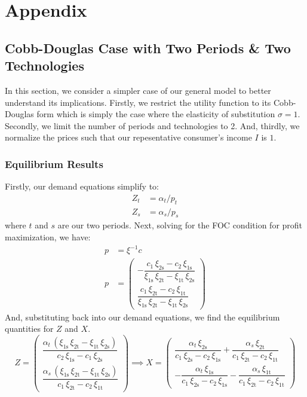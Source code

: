 \documentclass[11pt,a4paper]{extarticle}
\begin{document}
\pagebreak

\section{Appendix}


\subsection{Cobb-Douglas Case with Two Periods \& Two Technologies}

In this section, we consider a simpler case of our general model to better understand its implications. Firstly, we restrict the utility function to its Cobb-Douglas form which is simply the case where the elasticity of substitution $\sigma = 1$. Secondly, we limit the number of periods and technologies to 2. And, thirdly, we normalize the prices such that our repesentative consumer's income $I$ is $1$.

\subsubsection{Equilibrium Results}

Firstly, our demand equations simplify to:
\begin{align}
Z_t &= \alpha_t / p_t \\
Z_s &= \alpha_s / p_s
\end{align}
where $t$ and $s$ are our two periods. Next, solving for the FOC condition for profit maximization, we have:
\begin{align*}
p &=  \xi^{-1} c \\
p &= \begin{pmatrix}
-\dfrac{c_{1}\,\xi _{\mathrm{2s}}-c_{2}\,\xi _{\mathrm{1s}}}{\xi _{\mathrm{1s}}\,\xi _{\mathrm{2t}}-\xi _{\mathrm{1t}}\,\xi _{\mathrm{2s}}}  \\[2ex]
\dfrac{c_{1}\,\xi _{\mathrm{2t}}-c_{2}\,\xi _{\mathrm{1t}}}{\xi _{\mathrm{1s}}\,\xi _{\mathrm{2t}}-\xi _{\mathrm{1t}}\,\xi _{\mathrm{2s}}} 
\end{pmatrix} 
\end{align*}
And, substituting back into our demand equations, we find the equilibrium quantities for $Z$ and $X$. 
$$
Z = \begin{pmatrix}
\dfrac{\alpha _{t}\,\left(\xi _{\mathrm{1s}}\,\xi _{\mathrm{2t}}-\xi _{\mathrm{1t}}\,\xi _{\mathrm{2s}}\right)}{c_{2}\,\xi _{\mathrm{1s}} - c_{1}\,\xi _{\mathrm{2s}}} \\[2ex]
\dfrac{\alpha _{s}\,\left(\xi _{\mathrm{1s}}\,\xi _{\mathrm{2t}}-\xi _{\mathrm{1t}}\,\xi _{\mathrm{2s}}\right)}{c_{1}\,\xi _{\mathrm{2t}}-c_{2}\,\xi _{\mathrm{1t}}} 
\end{pmatrix}
\implies 
X = \begin{pmatrix}
\dfrac{\alpha _{t}\,\xi _{\mathrm{2s}}}{c_{1}\,\xi _{\mathrm{2s}}-c_{2}\,\xi _{\mathrm{1s}}}+\dfrac{\alpha _{s}\,\xi _{\mathrm{2t}}}{c_{1}\,\xi _{\mathrm{2t}}-c_{2}\,\xi _{\mathrm{1t}}} \\[2ex] 
-\dfrac{\alpha _{t}\,\xi _{\mathrm{1s}}}{c_{1}\,\xi _{\mathrm{2s}}-c_{2}\,\xi _{\mathrm{1s}}}-\dfrac{\alpha _{s}\,\xi _{\mathrm{1t}}}{c_{1}\,\xi _{\mathrm{2t}}-c_{2}\,\xi _{\mathrm{1t}}}
\end{pmatrix}
$$
\end{document}
